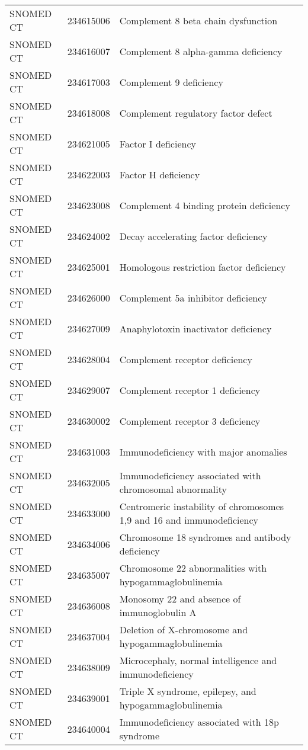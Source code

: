 \begin{longtable}{p{}p{}p{}}
  SNOMED CT & 234615006 & Complement 8 beta chain dysfunction \\ 
  SNOMED CT & 234616007 & Complement 8 alpha-gamma deficiency \\ 
  SNOMED CT & 234617003 & Complement 9 deficiency \\ 
  SNOMED CT & 234618008 & Complement regulatory factor defect \\ 
  SNOMED CT & 234621005 & Factor I deficiency \\ 
  SNOMED CT & 234622003 & Factor H deficiency \\ 
  SNOMED CT & 234623008 & Complement 4 binding protein deficiency \\ 
  SNOMED CT & 234624002 & Decay accelerating factor deficiency \\ 
  SNOMED CT & 234625001 & Homologous restriction factor deficiency \\ 
  SNOMED CT & 234626000 & Complement 5a inhibitor deficiency \\ 
  SNOMED CT & 234627009 & Anaphylotoxin inactivator deficiency \\ 
  SNOMED CT & 234628004 & Complement receptor deficiency \\ 
  SNOMED CT & 234629007 & Complement receptor 1 deficiency \\ 
  SNOMED CT & 234630002 & Complement receptor 3 deficiency \\ 
  SNOMED CT & 234631003 & Immunodeficiency with major anomalies \\ 
  SNOMED CT & 234632005 & Immunodeficiency associated with chromosomal abnormality \\ 
  SNOMED CT & 234633000 & Centromeric instability of chromosomes 1,9 and 16 and immunodeficiency \\ 
  SNOMED CT & 234634006 & Chromosome 18 syndromes and antibody deficiency \\ 
  SNOMED CT & 234635007 & Chromosome 22 abnormalities with hypogammaglobulinemia \\ 
  SNOMED CT & 234636008 & Monosomy 22 and absence of immunoglobulin A \\ 
  SNOMED CT & 234637004 & Deletion of X-chromosome and hypogammaglobulinemia \\ 
  SNOMED CT & 234638009 & Microcephaly, normal intelligence and immunodeficiency \\ 
  SNOMED CT & 234639001 & Triple X syndrome, epilepsy, and hypogammaglobulinemia \\ 
  SNOMED CT & 234640004 & Immunodeficiency associated with 18p syndrome \\ 

\end{longtable}
